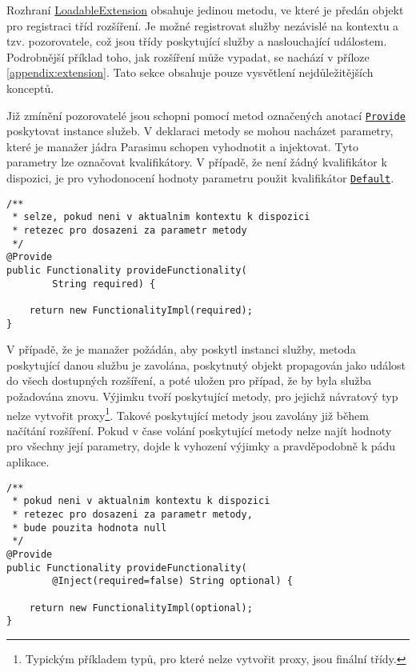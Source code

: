 Rozhraní \href{https://github.com/sybila/parasim/blob/master/core/src/main/java/org/sybila/parasim/core/spi/LoadableExtension.java}{LoadableExtension}
obsahuje jedinou metodu, ve které je pře\-dán objekt pro registraci tříd rozšíření. Je možné
registrovat služby ne\-zá\-vi\-slé na kontextu a tzv. pozorovatele, což jsou třídy poskytující
služby a naslouchající událostem. Podrobnější příklad toho, jak rozšíření může vypadat,
se nachází v příloze \ref{appendix:extension}. Tato sekce obsahuje pouze vysvětlení
nej\-dů\-le\-ži\-těj\-ších konceptů.

Již zmínění pozorovatelé jsou schopni pomocí metod označených anotací \href{https://github.com/sybila/parasim/blob/master/core/src/main/java/org/sybila/parasim/core/annotation/Provide.java}{\texttt{Provide}}
poskytovat instance služeb. V deklaraci metody se mohou na\-chá\-zet parametry,
které je manažer jádra Parasimu schopen vyhodnotit a injektovat. Tyto parametry
lze označovat kvalifikátory. V případě, že není žádný kvalifikátor k dispozici,
je pro vyhodonocení hodnoty parametru použit kvalifikátor \href{https://github.com/sybila/parasim/blob/master/core/src/main/java/org/sybila/parasim/core/annotation/Default.java}{\texttt{Default}}.

\begin{lstlisting}[label={code:provide:required}, caption={První metoda poskytující službu \texttt{Functionality}}]
/**
 * selze, pokud neni v aktualnim kontextu k dispozici 
 * retezec pro dosazeni za parametr metody
 */
@Provide
public Functionality provideFunctionality(
		String required) {

	return new FunctionalityImpl(required);
}
\end{lstlisting}

V případě, že je manažer požádán, aby poskytl instanci služby, metoda poskytující danou službu je zavolána,
poskytnutý objekt propagován jako událost do všech dostupných rozšíření, a poté uložen pro případ,
že by byla služba požadována znovu. Výjimku tvoří poskytující metody, pro jejichž
návratový typ nelze vytvořit proxy\footnote{Typickým příkladem typů, pro které nelze vytvořit proxy, jsou finální třídy.}.
Takové poskytující metody jsou zavolány již během načítání rozšíření. Pokud v čase volání
poskytující metody nelze najít hodnoty pro všechny její parametry, dojde k vyhození výjimky a
pravděpodobně k pádu aplikace.

\begin{lstlisting}[label={code:provide:optional}, caption={Druhá metoda poskytující službu \texttt{Functionality}}]
/**
 * pokud neni v aktualnim kontextu k dispozici 
 * retezec pro dosazeni za parametr metody,
 * bude pouzita hodnota null
 */
@Provide
public Functionality provideFunctionality(
		@Inject(required=false) String optional) {

	return new FunctionalityImpl(optional);
}
\end{lstlisting}

